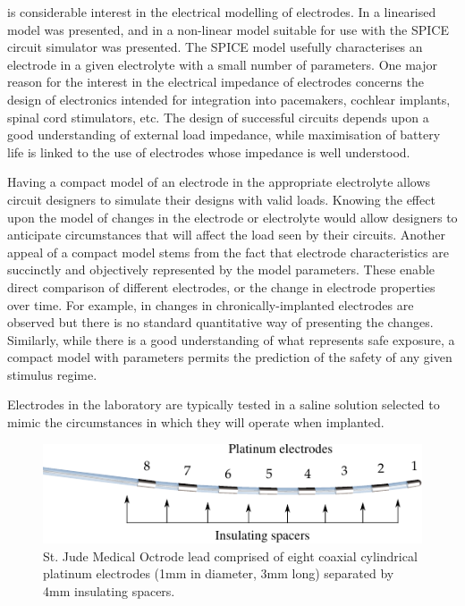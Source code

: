 \documentclass[journal, a4paper]{IEEEtran}
\begin{document}
 is considerable interest in the electrical modelling of electrodes. \cite{Cogan2008,Troy2006}
In \cite{Franks2005} a linearised model was presented, and in \cite{ScottSingle2013} a non-linear model
suitable for use with the SPICE circuit simulator was presented. The SPICE model usefully characterises an electrode in a given electrolyte with a small number of parameters.
One major reason for the interest in the electrical impedance of electrodes concerns the design of electronics intended for integration into pacemakers, cochlear implants, spinal cord stimulators, etc. The design of successful circuits depends upon a good understanding of external load impedance, while maximisation of battery life is linked to the use of electrodes whose impedance is well understood.

Having a compact model of an electrode in the appropriate electrolyte allows circuit designers to simulate their designs with valid loads. Knowing the effect upon the model of changes in the electrode or electrolyte would allow designers to anticipate circumstances that will affect the load seen by their circuits. Another appeal of a compact model stems from the fact that electrode characteristics are succinctly and objectively represented by the model parameters. These enable direct comparison of different electrodes, or the change in electrode properties over time. For example, in \cite{Kane13} changes in chronically-implanted electrodes are observed but there is no standard quantitative way of presenting the changes. Similarly, while there is a good understanding of what represents safe exposure, a compact model with parameters permits the prediction of the safety of any given stimulus regime.~\cite{Merrill05}

Electrodes in the laboratory are typically tested in a saline solution selected to mimic the circumstances in which they will operate when implanted.

\begin{figure}
    \begin{center}
    \includegraphics{graphics/StJudeOctrodeDiagram}
    \end{center}
    \caption{St. Jude Medical Octrode lead comprised of eight coaxial cylindrical platinum electrodes (1mm in diameter, 3mm long) separated by 4mm insulating spacers.}
    \label{fig:octrode}
\end{figure}
\end{document}
